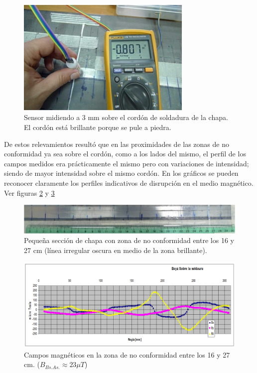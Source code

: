 \begin{figure}[htpb]
    \centering
    \includegraphics[width=0.751\textwidth]{./Figures/MedicionSensorChapa}
	\caption{Sensor midiendo a 3 mm sobre el cordón de soldadura de la chapa. El cordón está brillante porque se pule a piedra.}
	\label{fig:MedicionSensorChapa}
 \end{figure}
 
De estos relevamientos resultó que en las proximidades de las zonas de no conformidad ya sea sobre el cordón, como a los lados del mismo, el perfil de los campos medidos era prácticamente el mismo pero con variaciones de intensidad; siendo de mayor intensidad sobre el mismo cordón. En los gráficos se pueden reconocer claramente los perfiles indicativos de disrupción en el medio magnético\citep{Dubov:1}. Ver figuras \ref{fig:EscaneoAnalogicoChapa} y \ref{fig:EscaneoAnalogicoCampos}




\begin{figure}[H]
    \centering
    \includegraphics[width=1\textwidth]{./Figures/EscaneoAnalogicoChapa}
	\caption{Pequeña sección de chapa con zona de no conformidad entre los 16 y 27 cm (línea irregular oscura en medio de la zona brillante).}
	\label{fig:EscaneoAnalogicoChapa}
 \end{figure}

\begin{figure}[H]
    \centering
    \includegraphics[width=1\textwidth]{./Figures/EscaneoAnalogicoCampos}
	\caption{Campos magnéticos en la zona de no conformidad entre los 16 y 27 cm. ($B_{Bs.As.} \approx 23 \mu T$)}
	\label{fig:EscaneoAnalogicoCampos}
 \end{figure}
 
